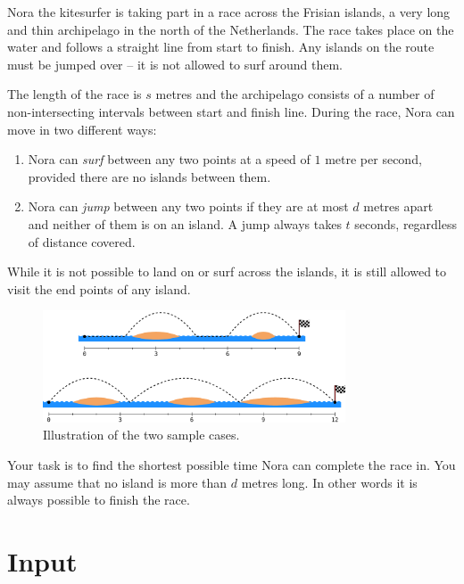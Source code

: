 
Nora the kitesurfer is taking part in a race across the Frisian islands, a very
long and thin archipelago in the north of the Netherlands.
The race takes place on the water and follows a straight line from start to finish.
Any islands on the route must be jumped over -- it is not allowed to surf around them.

The length of the race is $s$ metres and the archipelago consists of a number
of non-intersecting intervals between start and finish line.
During the race, Nora can move in two different ways:

\begin{enumerate}
  \item Nora can \emph{surf} between any two points at a speed of $1$ metre per
    second, provided there are no islands between them.
  \item Nora can \emph{jump} between any two points if they are at most $d$
    metres apart and neither of them is on an island. A jump always
    takes $t$ seconds, regardless of distance covered.
\end{enumerate}

While it is not possible to land on or surf across the islands,
it is still allowed to visit the end points of any island.

\vspace{-2mm}
\begin{figure}[!h]
  \centering
  \includegraphics[width=0.8\textwidth]{samples}
  \caption{Illustration of the two sample cases.}
\end{figure}

Your task is to find the shortest possible time Nora can complete the race in.
You may assume that no island is more than $d$ metres long. In other words it is
always possible to finish the race.

\vspace{-2mm}
\section*{Input}

